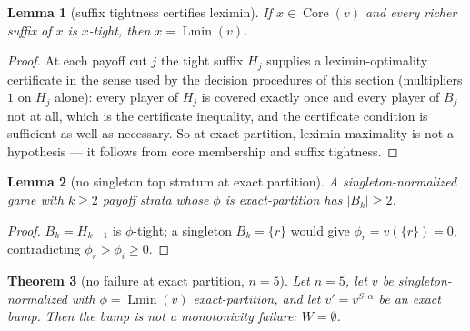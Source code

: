 \documentclass[11pt]{article}
\newtheorem{theorem}{Theorem}
\newtheorem{lemma}[theorem]{Lemma}
\newcommand{\core}{\operatorname{Core}}
\newcommand{\Lmin}{\operatorname{Lmin}}
\begin{document}
\begin{lemma}[suffix tightness certifies leximin]\label{mono:lem:ep1}
If $x\in\core(v)$ and every richer suffix of $x$ is $x$-tight, then
$x=\Lmin(v)$.
\end{lemma}

\begin{proof}
At each payoff cut $j$ the tight suffix $H_j$ supplies a leximin-optimality
certificate in the sense used by the decision procedures of this section
(multipliers $1$ on $H_j$ alone): every player of $H_j$ is covered exactly
once and every player of $B_j$ not at all, which is the certificate
inequality, and the certificate condition is sufficient as well as
necessary.  So at exact partition, leximin-maximality is not a hypothesis
--- it follows from core membership and suffix tightness.
\end{proof}

\begin{lemma}[no singleton top stratum at exact partition]
\label{mono:lem:ep2}
A singleton-normalized game with $k\ge2$ payoff strata whose $\phi$ is
exact-partition has $|B_k|\ge2$.
\end{lemma}

\begin{proof}
$B_k=H_{k-1}$ is $\phi$-tight; a singleton $B_k=\{r\}$ would give
$\phi_r=v(\{r\})=0$, contradicting $\phi_r>\phi_i\ge0$.
\end{proof}

\begin{theorem}[no failure at exact partition, $n=5$]\label{mono:thm:expart}
Let $n=5$, let $v$ be singleton-normalized with $\phi=\Lmin(v)$
exact-partition, and let $v'=v^{S,\alpha}$ be an exact bump.  Then the bump
is not a monotonicity failure: $W=\emptyset$.
\end{theorem}
\end{document}
